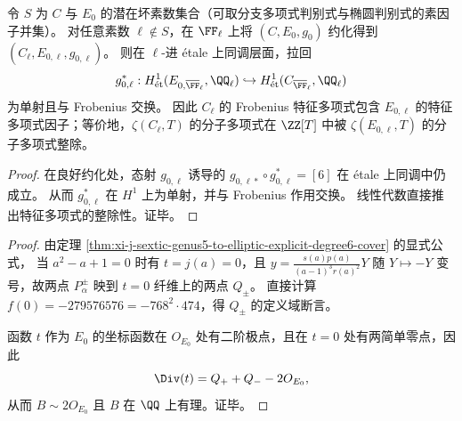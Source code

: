 \begin{proposition}\label{prop:xi-j-sextic-zeta-factor-divisibility}
令 \(S\) 为 \(C\) 与 \(E_0\) 的潜在坏素数集合（可取分支多项式判别式与椭圆判别式的素因子并集）。
对任意素数 \(\ell\notin S\)，在 \(\FF_\ell\) 上将 \((C,E_0,g_0)\) 约化得到 \((C_\ell,E_{0,\ell},g_{0,\ell})\)。
则在 \(\ell\)-进 \'{e}tale 上同调层面，拉回
\[
g_{0,\ell}^*:H^1_{\mathrm{\acute et}}(E_{0,\overline{\FF}_\ell},\QQ_\ell)\hookrightarrow H^1_{\mathrm{\acute et}}(C_{\overline{\FF}_\ell},\QQ_\ell)
\]
为单射且与 Frobenius 交换。
因此 \(C_\ell\) 的 Frobenius 特征多项式包含 \(E_{0,\ell}\) 的特征多项式因子；等价地，\(\zeta(C_\ell,T)\) 的分子多项式在 \(\ZZ[T]\) 中被 \(\zeta(E_{0,\ell},T)\) 的分子多项式整除。
\end{proposition}
\begin{proof}
在良好约化处，态射 \(g_{0,\ell}\) 诱导的 \(g_{0,\ell*}\circ g_{0,\ell}^*=[6]\) 在 \'{e}tale 上同调中仍成立。
从而 \(g_{0,\ell}^*\) 在 \(H^1\) 上为单射，并与 Frobenius 作用交换。
线性代数直接推出特征多项式的整除性。证毕。
\end{proof}

\begin{proof}
由定理 \ref{thm:xi-j-sextic-genus5-to-elliptic-explicit-degree6-cover} 的显式公式，
当 \(a^2-a+1=0\) 时有 \(t=j(a)=0\)，且 \(y=\frac{s(a)p(a)}{(a-1)^3r(a)^2}Y\) 随 \(Y\mapsto -Y\) 变号，故两点 \(P_\alpha^\pm\) 映到 \(t=0\) 纤维上的两点 \(Q_\pm\)。
直接计算
\(
f(0)=-279576576=-768^2\cdot 474
\)，得 \(Q_\pm\) 的定义域断言。
\par
函数 \(t\) 作为 \(E_0\) 的坐标函数在 \(O_{E_0}\) 处有二阶极点，且在 \(t=0\) 处有两简单零点，因此
\[
\Div(t)=Q_++Q_- - 2O_{E_0},
\]
从而 \(B\sim 2O_{E_0}\) 且 \(B\) 在 \(\QQ\) 上有理。证毕。
\end{proof}

